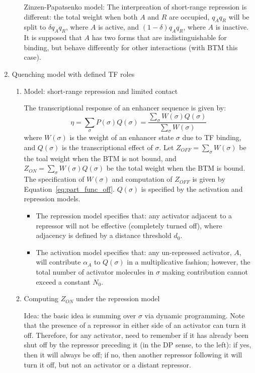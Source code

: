 \documentclass[11pt]{article}
\begin{document}
\begin{enumerate}
\begin{enumerate}
Zinzen-Papatsenko model: The interpreation of short-range repression is different: the total weight when both $A$ and $R$ are occupied, $q_A q_R$ will be split to $\delta q_A q_R$, where $A$ is active, and $(1 - \delta) q_A q_R$, where $A$ is inactive. It is supposed that $A$ has two forms that are indistinguishable for binding, but behave differently for other interactions (with BTM this case). 

\end{enumerate}

\item{Quenching model with defined TF roles}

\begin{enumerate}

\item{Model: short-range repression and limited contact}

The transcriptional response of an enhancer sequence is given by: 
\begin{equation}
\eta = \sum_{\sigma}P(\sigma) Q(\sigma) = \frac{\sum_{\sigma}W(\sigma) Q(\sigma)}{\sum_{\sigma}W(\sigma)}
\end{equation}
where $W(\sigma)$ is the weight of an enhancer state $\sigma$ due to TF binding, and $Q(\sigma)$ is the transcriptional effect of $\sigma$. Let $Z_{OFF} = \sum_{\sigma}W(\sigma)$ be the toal weight when the BTM is not bound, and $Z_{ON} = \sum_{\sigma}W(\sigma) Q(\sigma)$ be the total weight when the BTM is bound. The specification of $W(\sigma)$ and computation of $Z_{OFF}$ is given by Equation~\ref{eq:part_func_off}. $Q(\sigma)$ is specified by the activation and repression models. 
\begin{itemize}
\item The repression model specifies that: any activator adjacent to a repressor will not be effective (completely turned off), where adjacency is defined by a distance threshold $d_0$. 
\item The activation model specifies that: any un-repressed activator, $A$, will contribute $\alpha_A$ to $Q(\sigma)$ in a multiplicative fashion; however, the total number of activator molecules in $\sigma$ making contribution cannot exceed a constant $N_0$. 
\end{itemize}

\item{Computing $Z_{ON}$ under the repression model}

Idea: the basic idea is summing over $\sigma$ via dynamic programming. Note that the presence of a repressor in either side of an activator can turn it off. Therefore, for any activator, need to remember if it has already been shut off by the repressor preceding it (in the DP sense, to the left): if yes, then it will always be off; if no, then another repressor following it will turn it off, but not an activator or a distant repressor. 


\end{enumerate}
\end{enumerate}
\end{document}
